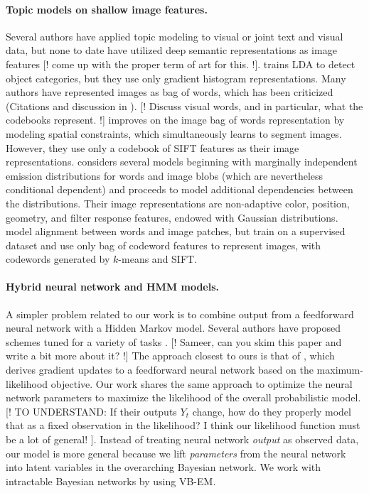 \documentclass[english]{article}
\begin{document}
\paragraph{Topic models on shallow image features.}
Several authors have applied topic modeling to visual or joint text and visual data, but none to date have utilized deep semantic representations as image features [! come up with the proper term of art for this. !].
\citet{Fritz08} trains LDA to detect object categories, but they use only gradient histogram representations.
Many authors have represented images as bag of words, which has been criticized (Citations and discussion in \citet{Cao07}).
[! Discuss visual words, and in particular, what the codebooks represent. !]
\citet{Cao07} improves on the image bag of words representation by modeling spatial constraints, which simultaneously learns to segment images. However, they use only a codebook of SIFT features as their image representations.
\citet{Barnard03} considers several models beginning with marginally independent emission distributions for words and image blobs (which are nevertheless conditional dependent) and proceeds to model additional dependencies between the distributions. Their image representations are non-adaptive color, position, geometry, and filter response features, endowed with Gaussian distributions.
\citet{Wang09} model alignment between words and image patches, but train on a supervised dataset and use only bag of codeword features to represent images, with codewords generated by $k$-means and SIFT.

\paragraph{Hybrid neural network and HMM models.}
A simpler problem related to our work is to combine output from a feedforward neural network with a Hidden Markov model. Several authors have proposed schemes tuned for a variety of tasks \citet{Trentin01}. [! Sameer, can you skim this paper and write a bit more about it? !] The approach closest to ours is that of \citet{Bengio92}, which derives gradient updates to a feedforward neural network based on the maximum-likelihood objective. Our work shares the same approach to optimize the neural network parameters to maximize the likelihood of the overall probabilistic model. [! TO UNDERSTAND: If their outputs $Y_t$ change, how do they properly model that as a fixed observation in the likelihood? I think our likelihood function must be a lot of general! ]. Instead of treating neural network \emph{output} as observed data, our model is more general because we lift \emph{parameters} from the neural network into latent variables in the overarching Bayesian network. We work with intractable Bayesian networks by using VB-EM.


\printbibliography
\end{document}
